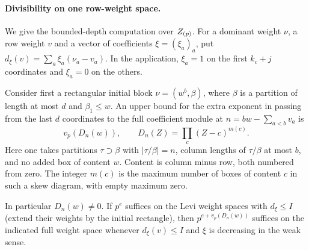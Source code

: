 \paragraph{Divisibility on one row-weight space.}
\hypertarget{source-lift-pieri-cost}{}
We give the bounded-depth computation over \(Z_{(p)}\).
For a dominant weight \(\nu\), a row weight \(v\) and a vector
of coefficients \(\xi=(\xi_a)_a\), put
\(d_\xi(v)=\sum_a\xi_a(\nu_a-v_a)\).
In the application, \(\xi_a=1\) on the first \(k_c+j\) coordinates
and \(\xi_a=0\) on the others.

\begin{lemma}
\label{lem:rectangular-pieri-denominator}
Consider first a rectangular
initial block \(\nu=(w^b,\beta)\), where \(\beta\) is a
partition of length at most \(d\) and \(\beta_1\le w\).
An upper bound for the extra exponent in passing from the
last \(d\) coordinates to the full coefficient module at
\(n=bw-\sum_{a<b}v_a\) is
\begin{equation}\label{eq:lift-pieri-polynomial}
 v_p(D_n(w)),\qquad
 D_n(Z)=\prod_{c}(Z-c)^{m(c)} .
\end{equation}
Here one takes partitions \(\tau\supset\beta\) with
\(|\tau/\beta|=n\), column lengths of \(\tau/\beta\) at
most \(b\), and no added box of content \(w\). Content is
column minus row, both numbered from zero. The integer
\(m(c)\) is the maximum number of boxes of content \(c\)
in such a skew diagram, with empty maximum zero.

In
particular \(D_n(w)\ne0\). If \(p^e\) suffices on the
Levi weight spaces with \(d_\xi\le I\) (extend their weights
by the initial rectangle), then \(p^{e+v_p(D_n(w))}\)
suffices on the indicated full weight space whenever
\(d_\xi(v)\le I\) and \(\xi\) is decreasing in the weak sense.
\label{cor:lift-pieri-cost-1}

\end{lemma}

